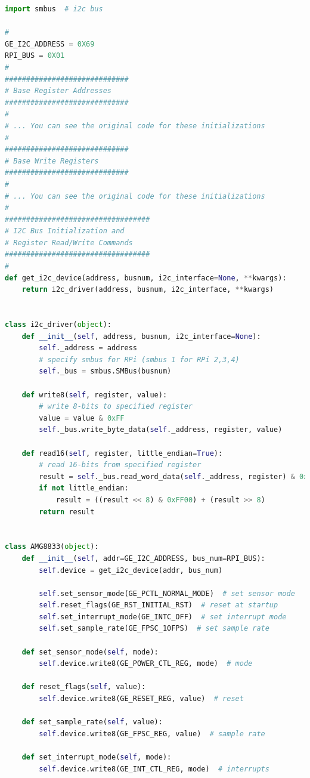 \begin{latin}
\begin{lstlisting}[language=python]
import smbus  # i2c bus

#
GE_I2C_ADDRESS = 0X69
RPI_BUS = 0X01
#
#############################
# Base Register Addresses
#############################
#
# ... You can see the original code for these initializations
#
#############################
# Base Write Registers
#############################
#
# ... You can see the original code for these initializations
#
##################################
# I2C Bus Initialization and
# Register Read/Write Commands
##################################
#
def get_i2c_device(address, busnum, i2c_interface=None, **kwargs):
    return i2c_driver(address, busnum, i2c_interface, **kwargs)


class i2c_driver(object):
    def __init__(self, address, busnum, i2c_interface=None):
        self._address = address
        # specify smbus for RPi (smbus 1 for RPi 2,3,4)
        self._bus = smbus.SMBus(busnum)

    def write8(self, register, value):
        # write 8-bits to specified register
        value = value & 0xFF
        self._bus.write_byte_data(self._address, register, value)

    def read16(self, register, little_endian=True):
        # read 16-bits from specified register
        result = self._bus.read_word_data(self._address, register) & 0xFFFF
        if not little_endian:
            result = ((result << 8) & 0xFF00) + (result >> 8)
        return result


class AMG8833(object):
    def __init__(self, addr=GE_I2C_ADDRESS, bus_num=RPI_BUS):
        self.device = get_i2c_device(addr, bus_num)

        self.set_sensor_mode(GE_PCTL_NORMAL_MODE)  # set sensor mode
        self.reset_flags(GE_RST_INITIAL_RST)  # reset at startup
        self.set_interrupt_mode(GE_INTC_OFF)  # set interrupt mode
        self.set_sample_rate(GE_FPSC_10FPS)  # set sample rate

    def set_sensor_mode(self, mode):
        self.device.write8(GE_POWER_CTL_REG, mode)  # mode

    def reset_flags(self, value):
        self.device.write8(GE_RESET_REG, value)  # reset

    def set_sample_rate(self, value):
        self.device.write8(GE_FPSC_REG, value)  # sample rate

    def set_interrupt_mode(self, mode):
        self.device.write8(GE_INT_CTL_REG, mode)  # interrupts


\end{lstlisting}
\end{latin}
